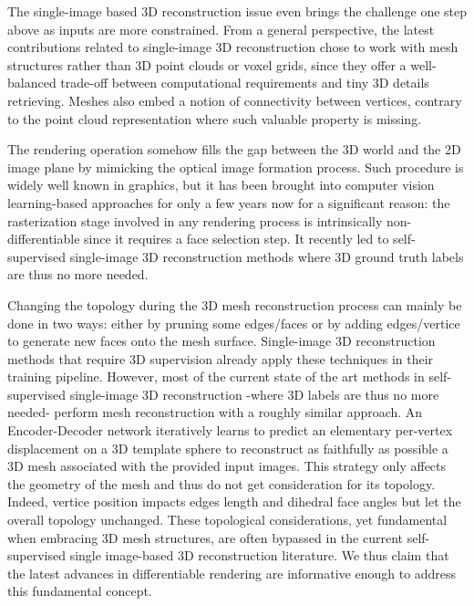 The single-image based 3D reconstruction issue even brings the challenge one step above as inputs are more constrained. From a general perspective, the latest contributions related to single-image 3D reconstruction chose to work with mesh structures rather than 3D point clouds or voxel grids, since they offer a well-balanced trade-off between computational requirements and tiny 3D details retrieving. Meshes also embed a notion of connectivity between vertices, contrary to the point cloud representation where such valuable property is missing.

The rendering operation somehow fills the gap between the 3D world and the 2D image plane by mimicking the optical image formation process. Such procedure is widely well known in graphics, but it has been brought into computer vision learning-based approaches for only a few years now for a significant reason: the rasterization stage involved in any rendering process is intrinsically non-differentiable since it requires a face selection step. It recently led to self-supervised single-image 3D reconstruction methods where 3D ground truth labels are thus no more needed.

Changing the topology during the 3D mesh reconstruction process can mainly be done in two ways: either by pruning some edges/faces or by adding edges/vertice to generate new faces onto the mesh surface. Single-image 3D reconstruction methods that require 3D supervision already apply these techniques in their training pipeline\citep{pan2019deep,nie2020total3dunderstanding,smith2019geometrics}. However, most of the current state of the art methods in self-supervised single-image 3D reconstruction -where 3D labels are thus no more needed- perform mesh reconstruction with a roughly similar approach. An Encoder-Decoder network iteratively learns to predict an elementary per-vertex displacement on a 3D template sphere to reconstruct as faithfully as possible a 3D mesh associated with the provided input images. This strategy only affects the geometry of the mesh and thus do not get consideration for its topology. Indeed, vertice position impacts edges length and dihedral face angles but let the overall topology unchanged. These topological considerations, yet fundamental when embracing 3D mesh structures, are often bypassed in the current self-supervised single image-based 3D reconstruction literature. We thus claim that the latest advances in differentiable rendering \citep{liu2019soft,ravi2020accelarating} are informative enough to address this fundamental concept.


